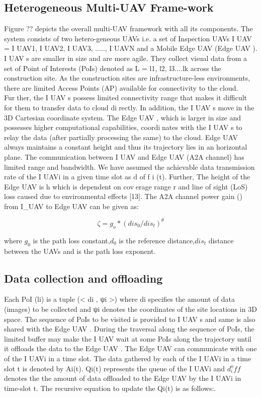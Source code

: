 \documentclass{article}
\begin{document}
\begin{multicols}{2}
\section{Heterogeneous Multi-UAV Frame-work}
Figure ?? depicts the overall multi-UAV framework with
all its components. The system consists of two hetero-geneous UAVs i.e. a set of Inspection UAVs I UAV =
{I UAV1, I UAV2, I UAV3, ....., I UAVN } and a Mobile
Edge UAV (Edge UAV ). I UAV s are smaller in size and
are more agile. They collect visual data from a set of
Point of Interests (PoIs) denoted as L = {l1, l2, l3....lk}
across the construction site. As the construction sites are
infrastructure-less environments, there are limited Access
Points (AP) available for connectivity to the cloud. Further, the I UAV s possess limited connectivity range that
makes it difficult for them to transfer data to cloud directly. In addition, the I UAV s move in the 3D Cartesian
coordinate system. The Edge UAV , which is larger in size
and possesses higher computational capabilities, coordinates with the I UAV s to relay the data (after partially
processing the same) to the cloud. Edge UAV always
maintains a constant height and thus its trajectory lies in
an horizontal plane.
The communication between I UAV and Edge UAV
(A2A channel) has limited range and bandwidth. We
have assumed the achievable data transmission rate of
the I UAVi
in a given time slot as d
of f
i
(t). Further, The
height of the Edge UAV is h which is dependent on coverage range r and line of sight (LoS) loss caused due to
environmental effects [13].
The A2A channel power gain (\zeta) from I_UAV to Edge UAV can be given as:

\[\zeta = g_o* (dis_0/dis_t)^\theta\]

where $g_0$ is the path loss constant,$d_0$ is the reference
distance,$dis_t$ distance between the UAVs and \theta is the path loss exponent.

\subsection{ Data collection and offloading}

Each PoI (li) is a tuple (< di
, ψi >) where di specifies the
amount of data (images) to be collected and ψi denotes the
coordinates of the site locations in 3D space. The sequence
of PoIs to be visited is provided to I UAV s and same is
also shared with the Edge UAV . During the traversal
along the sequence of PoIs, the limited buffer may make
the I UAV wait at some PoIs along the trajectory until
it offloads the data to the Edge UAV .
The Edge UAV can communicate with one of the
I UAVi
in a time slot. The data gathered by each of
the I UAVi
in a time slot t is denoted by Ai(t). Qi(t)
represents the queue of the I UAVi and $d_i^off$ denotes the the amount of data offloaded to the Edge UAV by the
I UAVi
in time-slot t. The recursive equation to update
the Qi(t) is as follows:.


\end{multicols}
\end{document}
